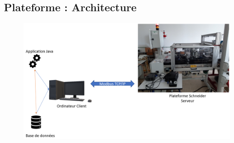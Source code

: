     \subsection{Plateforme : Architecture}
        \begin{frame}[allowframebreaks]
            \begin{figure}
                \includegraphics[width=1\linewidth]{images/architectureGeneraleNoDrone.png}
            \end{figure}
        \end{frame}
%
